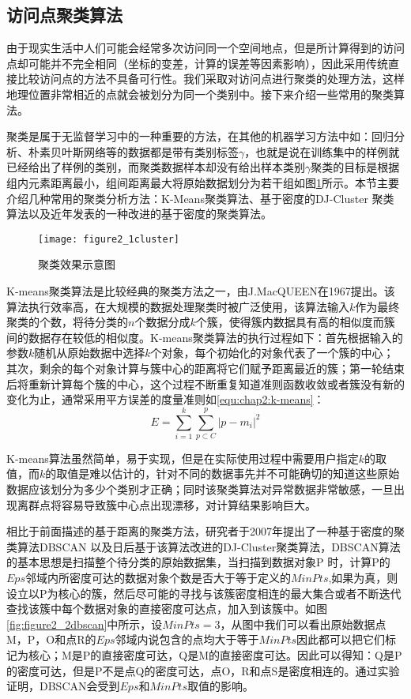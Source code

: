 \subsection{访问点聚类算法}
由于现实生活中人们可能会经常多次访问同一个空间地点，但是所计算得到的访问点却可能并不完全相同（坐标的变差，计算的误差等因素影响），因此采用传统直接比较访问点的方法不具备可行性。我们采取对访问点进行聚类的处理方法，这样地理位置非常相近的点就会被划分为同一个类别中。接下来介绍一些常用的聚类算法。
\par 聚类是属于无监督学习中的一种重要的方法，在其他的机器学习方法中如：回归分析、朴素贝叶斯网络等的数据都是带有类别标签$\gamma$，也就是说在训练集中的样例就已经给出了样例的类别，而聚类数据样本却没有给出样本类别$\gamma$聚类的目标是根据组内元素距离最小，组间距离最大将原始数据划分为若干组如图\ref{figure2_1cluster}所示。本节主要介绍几种常用的聚类分析方法：K-Means聚类算法、基于密度的DJ-Cluster 聚类算法以及近年发表的一种改进的基于密度的聚类算法。
\begin{figure}[htp]
\centering
\texttt{[image: figure2\_1cluster]}
\caption{聚类效果示意图}
\label{figure2_1cluster}
\end{figure}
\par  K-means聚类算法是比较经典的聚类方法之一，由J.MacQUEEN在1967提出。该算法执行效率高，在大规模的数据处理聚类时被广泛使用，该算法输入$k$作为最终聚类的个数，将待分类的$n$个数据分成$k$个簇，使得簇内数据具有高的相似度而簇间的数据存在较低的相似度。K-means聚类算法的执行过程如下：首先根据输入的参数$k$随机从原始数据中选择$k$个对象，每个初始化的对象代表了一个簇的中心；其次，剩余的每个对象计算与簇中心的距离将它们赋予距离最近的簇；第一轮结束后将重新计算每个簇的中心，这个过程不断重复知道准则函数收敛或者簇没有新的变化为止，通常采用平方误差的度量准则如\ref{equ:chap2:k-means}：
\begin{equation}
\label{equ:chap2:k-means}
E=\sum_{i=1}^{k}\sum_{p\subset C}^{p}{\left | p-m_{i} \right |^{2}}
\end{equation}
\par K-means算法虽然简单，易于实现，但是在实际使用过程中需要用户指定$k$的取值，而$k$的取值是难以估计的，针对不同的数据事先并不可能确切的知道这些原始数据应该划分为多少个类别才正确；同时该聚类算法对异常数据非常敏感，一旦出现离群点将容易导致簇中心点出现漂移，对计算结果影响巨大。
\par 相比于前面描述的基于距离的聚类方法，研究者于2007年提出了一种基于密度的聚类算法DBSCAN 以及日后基于该算法改进的DJ-Cluster聚类算法，DBSCAN算法的基本思想是扫描整个待分类的原始数据集，当扫描到数据对象P 时，计算P的$Eps$邻域内所密度可达的数据对象个数是否大于等于定义的$MinPts$,如果为真，则设立以P为核心的簇，然后尽可能的寻找与该簇密度相连的最大集合或者不断迭代查找该簇中每个数据对象的直接密度可达点，加入到该簇中。如图\ref{fig:figure2_2dbscan}中所示，设$MinPts=3$，从图中我们可以看出原始数据点M，P，O和点R的$Eps$邻域内说包含的点均大于等于$MinPts$因此都可以把它们标记为核心；M是P的直接密度可达，Q是M的直接密度可达。因此可以得知：Q是P 的密度可达，但是P不是点Q的密度可达，点O，R和点S是密度相连的。通过实验证明，DBSCAN会受到$Eps$和$MinPts$取值的影响。
